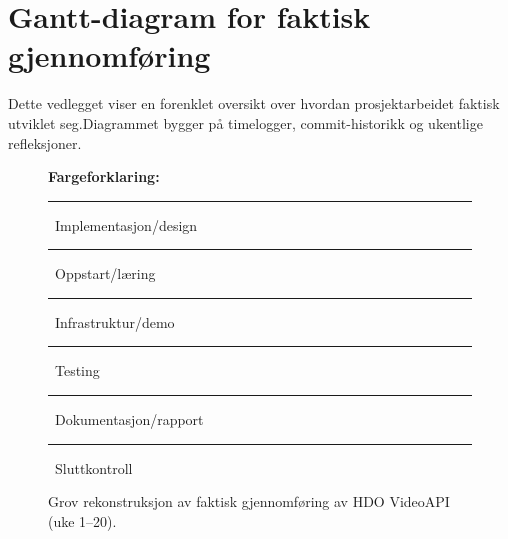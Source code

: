 \chapter{Gantt-diagram for faktisk gjennomføring}
\label{app:gantt}

Dette vedlegget viser en forenklet oversikt over hvordan prosjektarbeidet faktisk utviklet seg.Diagrammet bygger på timelogger, commit-historikk og ukentlige refleksjoner.

\begin{figure}[H]
\centering


\vspace{0.2em}
{\tiny
\textbf{Fargeforklaring:}\;
\textcolor{red!40}{\rule{0.45cm}{0.13cm}}~Implementasjon/design \;
\textcolor{blue!30}{\rule{0.45cm}{0.13cm}}~Oppstart/læring \;
\textcolor{green!30}{\rule{0.45cm}{0.13cm}}~Infrastruktur/demo \;
\textcolor{orange!30}{\rule{0.45cm}{0.13cm}}~Testing \;
\textcolor{purple!30}{\rule{0.45cm}{0.13cm}}~Dokumentasjon/rapport \;
\textcolor{yellow!30}{\rule{0.45cm}{0.13cm}}~Sluttkontroll
}

\caption{Grov rekonstruksjon av faktisk gjennomføring av HDO VideoAPI (uke 1--20).}
\label{fig:gantt-faktisk}
\end{figure}